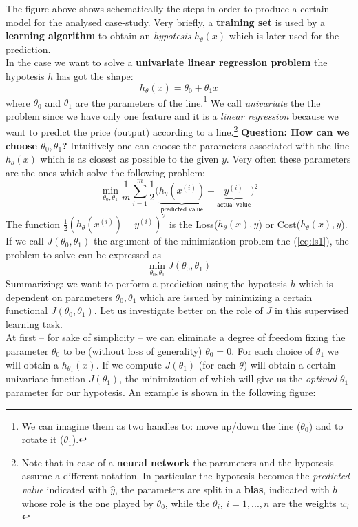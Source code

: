 The figure above shows schematically the steps in order to produce a certain model for the analysed case-study. Very briefly, a \textbf{training set} is used by a \textbf{learning algorithm} to obtain an \textit{hypotesis} $h_\theta(x)$ which is later used for the prediction.\\
In the case we want to solve a \textbf{univariate linear regression problem} the hypotesis $h$ has got the shape:
\begin{equation}
    h_{\theta}(x)=\theta_0+\theta_1{x}
\end{equation}
where $\theta_0$ and $\theta_1$ are the parameters of the line.\footnote{
    We can imagine them as two handles to: move up/down the line ($\theta_0$) and to rotate it ($\theta_1$).
} We call \textit{univariate} the the problem since we have only one feature and it is a \textit{linear regression} because we want to predict the price (output) according to a line.\footnote{
    Note that in case of a \textbf{neural network} the parameters and the hypotesis assume a different notation. In particular the hypotesis becomes the \textit{predicted value} indicated with $\hat{y}$, the parameters are split in a \textbf{bias}, indicated with $b$ whose role is the one played by $\theta_0$, while the $\theta_i$, $i=1,...,n$ are the weights $w_i$
 }
\textbf{Question: How can we choose $\theta_0, \theta_1$?} Intuitively one can choose the parameters associated with the line $h_\theta(x)$ which is as closest as possible to the given $y$. Very often these parameters are the ones which solve the following problem: 
\begin{equation}\label{eq:ls1}
    \min_{\theta_0, \theta_1} {\frac{1}{m} \sum_{i=1}^{m}{
        \frac{1}{2} \bigl(
            \underbrace{h_\theta(x^{(i)})}_{\textsf{predicted value}}-
            \underbrace{y^{(i)}}_{\textsf{actual value}}
            \bigr)^2
    }}
\end{equation}
The function $\frac{1}{2} (
    h_\theta(x^{(i)})-y^{(i)})^2$ is the \textsf{Loss}($h_\theta(x), y$) or \textsf{Cost}($h_\theta(x),y$).  If we call $J(\theta_0, \theta_1)$ the argument of the minimization problem the (\ref{eq:ls1}), the problem to solve can be expressed as
\begin{equation}\label{ls2}
    \min_{\theta_0, \theta_1} {J({\theta_0, \theta_1})}
\end{equation}
Summarizing: we want to perform a prediction using the hypotesis $h$ which is dependent on parameters $\theta_0, \theta_1$ which are issued by minimizing a certain functional $J(\theta_0, \theta_1)$. Let us investigate better on the role of $J$ in this supervised learning task.\\
At first -- for sake of simplicity -- we can eliminate a degree of freedom fixing the parameter $\theta_0$ to be (without loss of generality) $\theta_0=0$. For each choice of $\theta_1$ we will obtain a $h_{\theta_1}(x)$. If we compute $J(\theta_1)$ (for each $\theta$) will obtain a certain univariate function $J(\theta_1)$, the minimization of which will give us the \textit{optimal} $\theta_1$ parameter for our hypotesis. An example is shown in the following figure:

